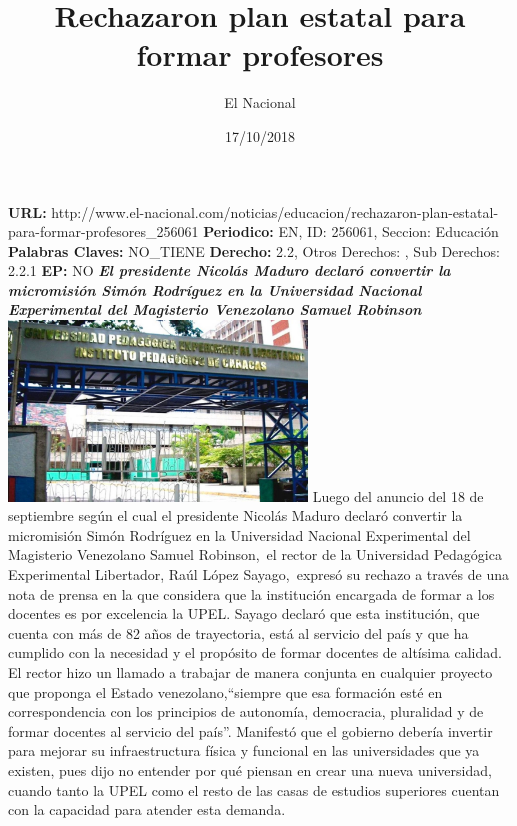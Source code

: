 \documentclass{article}%
\title{\textbf{Rechazaron plan estatal para formar profesores}}%
\author{El Nacional}%
\date{17/10/2018}%
\begin{document}
%
\normalsize%
\maketitle%
\textbf{URL: }%
http://www.el{-}nacional.com/noticias/educacion/rechazaron{-}plan{-}estatal{-}para{-}formar{-}profesores\_256061\newline%
%
\textbf{Periodico: }%
EN, %
ID: %
256061, %
Seccion: %
Educación\newline%
%
\textbf{Palabras Claves: }%
NO\_TIENE\newline%
%
\textbf{Derecho: }%
2.2, %
Otros Derechos: %
, %
Sub Derechos: %
2.2.1\newline%
%
\textbf{EP: }%
NO\newline%
\newline%
%
\textbf{\textit{El presidente Nicolás Maduro declaró convertir la micromisión Simón Rodríguez en la Universidad Nacional Experimental del Magisterio Venezolano Samuel Robinson}}%
\newline%
\newline%
%
\includegraphics[width=300px]{156.jpg}%
\newline%
%
Luego del anuncio del 18 de septiembre según el cual el presidente Nicolás Maduro declaró convertir la micromisión Simón Rodríguez en la Universidad Nacional Experimental del Magisterio Venezolano Samuel Robinson,~el rector de la Universidad Pedagógica Experimental Libertador, Raúl López Sayago,~expresó su rechazo a través de una nota de prensa en la que considera que la institución encargada de formar a los docentes es por excelencia la UPEL.%
\newline%
%
Sayago declaró que esta institución, que cuenta con más de 82 años de trayectoria, está al servicio del país y que ha cumplido con la necesidad y el propósito de formar docentes de altísima calidad.%
\newline%
%
El rector hizo un llamado a trabajar de manera conjunta en cualquier proyecto que proponga el Estado venezolano,“siempre que esa formación esté en correspondencia con los principios de autonomía, democracia, pluralidad y de formar docentes al servicio del país”.%
\newline%
%
Manifestó que el gobierno debería invertir para mejorar su infraestructura física y funcional en las universidades que ya existen, pues dijo no entender por qué piensan en crear una nueva universidad, cuando tanto la UPEL como el resto de las casas de estudios superiores cuentan con la capacidad para atender esta demanda.%
\newline%
%
\end{document}
